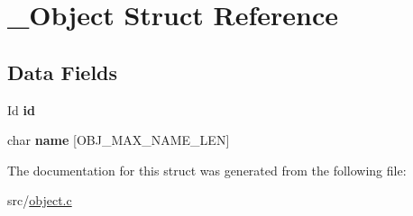 \hypertarget{struct__Object}{}\section{\+\_\+\+Object Struct Reference}
\label{struct__Object}
\subsection*{Data Fields}
\begin{DoxyCompactItemize}
\item 
\mbox{\label{struct__Object_a3cff7a0e8dc4e9d23895ed9af1b7653a}} 
Id {\bfseries id}
\item 
\mbox{\label{struct__Object_a9cb87156f0fc0949a1fc8bc0e7ee2447}} 
char {\bfseries name} \mbox{[}O\+B\+J\+\_\+\+M\+A\+X\+\_\+\+N\+A\+M\+E\+\_\+\+L\+EN\mbox{]}
\end{DoxyCompactItemize}


The documentation for this struct was generated from the following file\+:\begin{DoxyCompactItemize}
\item 
src/\hyperlink{object_8c}{object.\+c}\end{DoxyCompactItemize}
